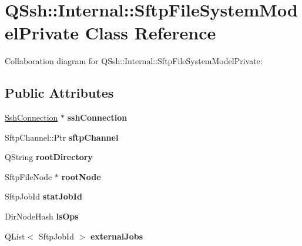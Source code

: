 \hypertarget{class_q_ssh_1_1_internal_1_1_sftp_file_system_model_private}{}\section{Q\+Ssh\+:\+:Internal\+:\+:Sftp\+File\+System\+Model\+Private Class Reference}
\label{class_q_ssh_1_1_internal_1_1_sftp_file_system_model_private}


Collaboration diagram for Q\+Ssh\+:\+:Internal\+:\+:Sftp\+File\+System\+Model\+Private\+:
\subsection*{Public Attributes}
\begin{DoxyCompactItemize}
\item 
\mbox{\label{class_q_ssh_1_1_internal_1_1_sftp_file_system_model_private_a6bae4d986fc03a662fe0bf66339c39e5}} 
\mbox{\hyperlink{class_q_ssh_1_1_ssh_connection}{Ssh\+Connection}} $\ast$ {\bfseries ssh\+Connection}
\item 
\mbox{\label{class_q_ssh_1_1_internal_1_1_sftp_file_system_model_private_ae0b6dc980e9aed1ce6d04f13a069f4a5}} 
Sftp\+Channel\+::\+Ptr {\bfseries sftp\+Channel}
\item 
\mbox{\label{class_q_ssh_1_1_internal_1_1_sftp_file_system_model_private_a8f04f2ddaba5d6e592b524a00af76f92}} 
Q\+String {\bfseries root\+Directory}
\item 
\mbox{\label{class_q_ssh_1_1_internal_1_1_sftp_file_system_model_private_acd216c78e92017a9e2ebd4da4cd40056}} 
Sftp\+File\+Node $\ast$ {\bfseries root\+Node}
\item 
\mbox{\label{class_q_ssh_1_1_internal_1_1_sftp_file_system_model_private_a5c82ba4bb079c3a23c37e9d41aabb12d}} 
Sftp\+Job\+Id {\bfseries stat\+Job\+Id}
\item 
\mbox{\label{class_q_ssh_1_1_internal_1_1_sftp_file_system_model_private_ae91d6fee4b46ed7ce30f32e862b04bc1}} 
Dir\+Node\+Hash {\bfseries ls\+Ops}
\item 
\mbox{\label{class_q_ssh_1_1_internal_1_1_sftp_file_system_model_private_aa9dac92ee2828512404187191b1f5776}} 
Q\+List$<$ Sftp\+Job\+Id $>$ {\bfseries external\+Jobs}
\end{DoxyCompactItemize}


